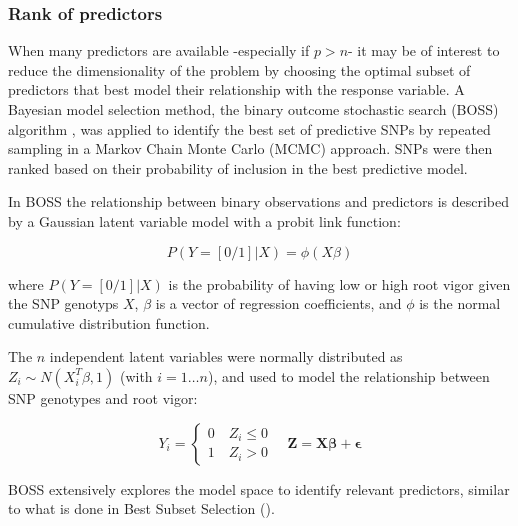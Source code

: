 \subsubsection{Rank of predictors}
\label{par:boss}
When many predictors are available -especially if $p>n$- it may be
of interest to reduce the dimensionality of the problem by choosing the
optimal subset of predictors that best model their relationship with the response
variable.
A Bayesian model selection method, the binary outcome stochastic search
(BOSS) algorithm \cite{russu2012stochastic}, was applied to identify the best set of predictive
SNPs by repeated sampling in a Markov Chain Monte
Carlo (MCMC) approach.  
SNPs were then ranked based on their probability of inclusion in the best
predictive model.
 
In BOSS the relationship between binary observations and predictors is
described by a Gaussian latent variable model with a probit link function:

\begin{equation}
P(Y=[0/1]|X)=\phi(X \beta)
\label{eq:probit}
\end{equation} 

where $P(Y=[0/1]|X)$ is the probability of having low or high root vigor
given the SNP genotyps $X$, $\beta$ is a vector of regression
coefficients, and $\phi$ is the normal cumulative distribution function. 

The $n$ independent latent variables were normally distributed as $Z_i \sim
N(X_i^T\beta,1)$ (with $i=1 \ldots n$), and used to model the relationship between SNP genotypes and root vigor:

\begin{equation}
Y_i = \left\{ 
\begin{array}{ll}
0 \quad Z_i \leq 0 \\
1 \quad Z_i > 0
\end{array}
\right.
\quad \mathbf{Z}=\mathbf{X\beta+\epsilon}
\label{eq:threshold}
\end{equation}

BOSS extensively explores the model space to identify relevant
predictors, similar to what is done in Best Subset Selection (\cite{hastie2009model}).


